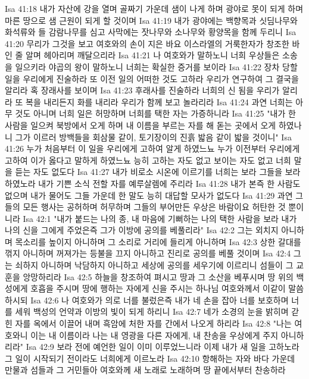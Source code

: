 Isa 41:18  내가 자산에 강을 열며 골짜기 가운데 샘이 나게 하며 광야로 못이 되게 하며 마른 땅으로 샘 근원이 되게 할 것이며
Isa 41:19  내가 광야에는 백향목과 싯딤나무와 화석류와 들 감람나무를 심고 사막에는 잣나무와 소나무와 황양목을 함께 두리니
Isa 41:20  무리가 그것을 보고 여호와의 손이 지은 바요 이스라엘의 거룩한자가 창조한 바인 줄 알며 헤아리며 깨달으리라
Isa 41:21  나 여호와가 말하노니 너희 우상들은 소송을 일으키라 야곱의 왕이 말하노니 너희는 확실한 증거를 보이라
Isa 41:22  장차 당할 일을 우리에게 진술하라 또 이전 일의 어떠한 것도 고하라 우리가 연구하여 그 결국을 알리라 혹 장래사를 보이며
Isa 41:23  후래사를 진술하라 너희의 신 됨을 우리가 알리라 또 복을 내리든지 화를 내리라 우리가 함께 보고 놀라리라
Isa 41:24  과연 너희는 아무 것도 아니며 너희 일은 허망하며 너희를 택한 자는 가증하니라
Isa 41:25  "내가 한 사람을 일으켜 북방에서 오게 하며 내 이름을 부르는 자를 해 돋는 곳에서 오게 하였나니 그가 이르러 방백들을 회삼물 같이, 토기장이의 진흙 밟음 같이 밟을 것이니"
Isa 41:26  누가 처음부터 이 일을 우리에게 고하여 알게 하였느뇨 누가 이전부터 우리에게 고하여 이가 옳다고 말하게 하였느뇨 능히 고하는 자도 없고 보이는 자도 없고 너희 말을 듣는 자도 없도다
Isa 41:27  내가 비로소 시온에 이르기를 너희는 보라 그들을 보라 하였노라 내가 기쁜 소식 전할 자를 예루살렘에 주리라
Isa 41:28  내가 본즉 한 사람도 없으며 내가 물어도 그들 가운데 한 말도 능히 대답할 모사가 없도다
Isa 41:29  과연 그들의 모든 행사는 공허하며 허무하며 그들의 부어만든 우상은 바람이요 허탄한 것 뿐이니라
Isa 42:1  "내가 붙드는 나의 종, 내 마음에 기뻐하는 나의 택한 사람을 보라 내가 나의 신을 그에게 주었은즉 그가 이방에 공의를 베풀리라"
Isa 42:2  그는 외치지 아니하며 목소리를 높이지 아니하며 그 소리로 거리에 들리게 아니하며
Isa 42:3  상한 갈대를 꺾지 아니하며 꺼져가는 등불을 끄지 아니하고 진리로 공의를 베풀 것이며
Isa 42:4  그는 쇠하지 아니하며 낙담하지 아니하고 세상에 공의를 세우기에 이르리니 섬들이 그 교훈을 앙망하리라
Isa 42:5  하늘을 창조하여 펴시고 땅과 그 소산을 베푸시며 땅 위의 백성에게 호흡을 주시며 땅에 행하는 자에게 신을 주시는 하나님 여호와께서 이같이 말씀하시되
Isa 42:6  나 여호와가 의로 너를 불렀은즉 내가 네 손을 잡아 너를 보호하며 너를 세워 백성의 언약과 이방의 빛이 되게 하리니
Isa 42:7  네가 소경의 눈을 밝히며 갇힌 자를 옥에서 이끌어 내며 흑암에 처한 자를 간에서 나오게 하리라
Isa 42:8  "나는 여호와니 이는 내 이름이라 나는 내 영광을 다른 자에게, 내 찬송을 우상에게 주지 아니하리라"
Isa 42:9  보라 전에 예언한 일이 이미 이루었느니라 이제 내가 새 일을 고하노라 그 일이 시작되기 전이라도 너희에게 이르노라
Isa 42:10  항해하는 자와 바다 가운데 만물과 섬들과 그 거민들아 여호와께 새 노래로 노래하며 땅 끝에서부터 찬송하라
